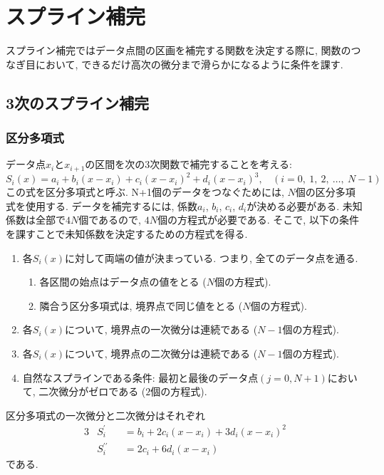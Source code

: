 \clearpage

\section{スプライン補完}
スプライン補完ではデータ点間の区画を補完する関数を決定する際に, 関数のつなぎ目において, できるだけ高次の微分まで滑らかになるように条件を課す.

\subsection{3次のスプライン補完}
\subsubsection{区分多項式}
データ点$x_{i}$と$x_{i+1}$の区間を次の3次関数で補完することを考える:
\begin{equation}
    S_{i} (x) =
    a_{i} +
    b_{i} (x - x_{i}) +
    c_{i} (x - x_{i})^{2} +
    d_{i} (x - x_{i})^{3}
    ,~~~~
    (i = 0,~1,~2,~\ldots,~N-1)
\end{equation}
この式を区分多項式と呼ぶ. N+1個のデータをつなぐためには, $N$個の区分多項式を使用する.
データを補完するには, 係数$a_{i}$, $b_{i}$, $c_{i}$, $d_{i}$が決める必要がある.
未知係数は全部で$4N$個であるので, $4N$個の方程式が必要である.
そこで, 以下の条件を課すことで未知係数を決定するための方程式を得る.
\begin{enumerate}
    \item 各$S_{i}(x)$に対して両端の値が決まっている. つまり, 全てのデータ点を通る.
    \begin{enumerate}
        \item 各区間の始点はデータ点の値をとる ($N$個の方程式).
        \item 隣合う区分多項式は, 境界点で同じ値をとる ($N$個の方程式).
    \end{enumerate}
    \item 各$S_{i}(x)$について, 境界点の一次微分は連続である ($N-1$個の方程式).
    \item 各$S_{i}(x)$について, 境界点の二次微分は連続である ($N-1$個の方程式).
    \item 自然なスプラインである条件: 最初と最後のデータ点$(j=0,N+1)$において, 二次微分がゼロである ($2$個の方程式).
\end{enumerate}
区分多項式の一次微分と二次微分はそれぞれ
\begin{alignat}{3}
    & S_{i}^{\prime} &&=
      b_{i} +
    2 c_{i} (x - x_{i}) +
    3 d_{i} (x - x_{i})^{2}
    \\
    & S_{i}^{\prime\prime} &&=
    2 c_{i} +
    6 d_{i} (x - x_{i})
\end{alignat}
である.

